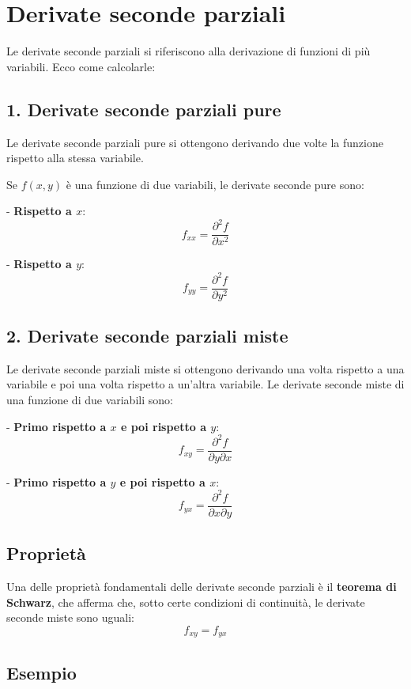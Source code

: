 \documentclass{article}
\begin{document}
\section*{Derivate seconde parziali}

Le derivate seconde parziali si riferiscono alla derivazione di funzioni di più variabili. Ecco come calcolarle:

\subsection*{1. Derivate seconde parziali pure}

Le derivate seconde parziali pure si ottengono derivando due volte la funzione rispetto alla stessa variabile.

Se \( f(x, y) \) è una funzione di due variabili, le derivate seconde pure sono:

- \textbf{Rispetto a \( x \)}:
\[
f_{xx} = \frac{\partial^2 f}{\partial x^2}
\]

- \textbf{Rispetto a \( y \)}:
\[
f_{yy} = \frac{\partial^2 f}{\partial y^2}
\]

\subsection*{2. Derivate seconde parziali miste}

Le derivate seconde parziali miste si ottengono derivando una volta rispetto a una variabile e poi una volta rispetto a un'altra variabile. Le derivate seconde miste di una funzione di due variabili sono:

- \textbf{Primo rispetto a \( x \) e poi rispetto a \( y \)}:
\[
f_{xy} = \frac{\partial^2 f}{\partial y \partial x}
\]

- \textbf{Primo rispetto a \( y \) e poi rispetto a \( x \)}:
\[
f_{yx} = \frac{\partial^2 f}{\partial x \partial y}
\]

\subsection*{Proprietà}

Una delle proprietà fondamentali delle derivate seconde parziali è il \textbf{teorema di Schwarz}, che afferma che, sotto certe condizioni di continuità, le derivate seconde miste sono uguali:
\[
f_{xy} = f_{yx}
\]

\subsection*{Esempio}
\end{document}
